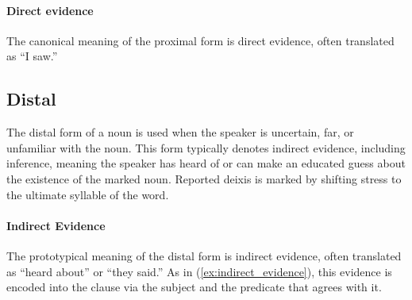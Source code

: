 \paragraph{Direct evidence}
The canonical meaning of the proximal form is direct evidence, often translated as “I saw.” 




\subsection{Distal}
The distal form of a noun is used when the speaker is uncertain, far, or unfamiliar with the noun. 
This form typically denotes indirect evidence, including inference, meaning the speaker has heard of or can make an educated guess about the existence of the marked noun. Reported deixis is marked by shifting stress to the ultimate syllable of the word.

\paragraph{Indirect Evidence}
The prototypical meaning of the distal form is indirect evidence, often translated as “heard about” or “they said.” As in (\ref{ex:indirect_evidence}), this evidence is encoded into the clause via the subject and the predicate that agrees with it.


